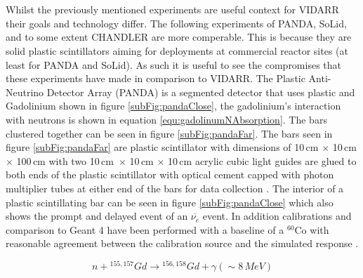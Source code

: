 \\\\Whilst the previously mentioned experiments are useful context for VIDARR their goals and technology differ. The following experiments of PANDA, SoLid, and to some extent CHANDLER are more comperable. This is because they are solid plastic scintillators aiming for deployments at commercial reactor sites (at least for PANDA and SoLid). As such it is useful to see the compromises that these experiments have made in comparison to VIDARR. The Plastic Anti-Neutrino Detector Array (PANDA) is a segmented detector that uses plastic and Gadolinium shown in figure \ref{subFig:pandaClose}, the gadolinium's interaction with neutrons is shown in equation \ref{equ:gadolinumNAbsorption}. The bars clustered together can be seen in figure \ref{subFig:pandaFar}. The bars seen in figure \ref{subFig:pandaFar} are plastic scintillator with dimensions of 10\,cm $\times$ 10\,cm $\times$ 100\,cm with two 10\,cm\ $\times$ 10\,cm $\times$ 10\,cm acrylic cubic light guides are glued to both ends of the plastic scintillator with optical cement capped with photon multiplier tubes at either end of the bars for data collection \cite{PANDA_2014}. The interior of a plastic scintillating bar can be seen in figure \ref{subFig:pandaClose} which also shows the prompt and delayed event of an $\overline{\nu_e}$ event. In addition calibrations and comparison to Geant 4 \cite{Agostinelli:2002hh} have been performed with a baseline of a $^{60}$Co with reasonable agreement between the calibration source and the simulated response \cite{PANDA_2012}. 

\begin{equation}
n + {^{155,157}Gd} \rightarrow {^{156,158} Gd} + \gamma (\sim 8\,MeV)
\label{equ:gadolinumNAbsorption}
\end{equation}

